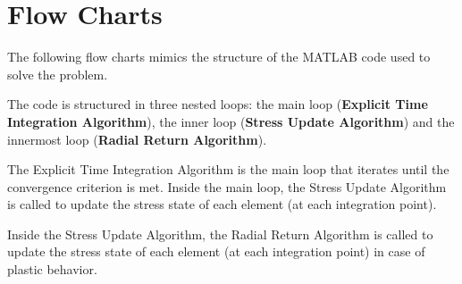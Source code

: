 \section{Flow Charts}
\label{appendix:flowcharts}

The following flow charts mimics the structure of the MATLAB code used to solve the problem.

The code is structured in three nested loops: the main loop (\textbf{Explicit Time Integration Algorithm}), the inner loop (\textbf{Stress Update Algorithm}) and the innermost loop (\textbf{Radial Return Algorithm}).

The Explicit Time Integration Algorithm is the main loop that iterates until the convergence criterion is met.
Inside the main loop, the Stress Update Algorithm is called to update the stress state of each element (at each integration point).

Inside the Stress Update Algorithm, the Radial Return Algorithm is called to update the stress state of each element (at each integration point) in case of plastic behavior.

